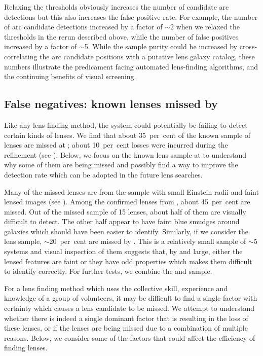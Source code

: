 \documentclass[useAMS,usenatbib,a4paper]{mn2e}
\begin{document}
Relaxing the \af thresholds obviously increases the number of candidate arc
detections but this also increases the false positive rate.
For example, the number of arc candidate detections increased by a factor
of $\sim$2 when we relaxed the thresholds in the rerun described above,
while the number of false positives increased by a factor of $\sim$5.
While the \af sample purity could be increased by
cross-correlating the arc candidate positions with a putative lens
galaxy catalog, these numbers illustrate the predicament facing automated
lens-finding algorithms, and the continuing benefits of visual screening.


\subsection{False negatives: known lenses missed by \sw}
\label{sec:fn}

Like any lens finding method, the \sw system could potentially be
failing to detect certain kinds of lenses.  We find that about
35~per~cent of the known sample of lenses are missed at \StageOne; 
about 10~per~cent losses were incurred during the \StageTwo refinement
(see ).  Below, we focus on the known lens sample at
\StageOne to understand why some of them are being missed and possibly
find a way to improve the detection rate which can be adopted in the
future \sw lens searches.

Many of the missed lenses are from the \rf sample with small
Einstein radii and faint lensed images (see ). Among
the confirmed lenses from \rf, about 45~per~cent are missed. Out of the
missed sample of 15 lenses, about half of them are visually difficult to
detect. The other half appear to have faint blue smudges around
galaxies which should have been easier to identify. Similarly,
if we consider the \af lens sample, $\sim$20~per~cent are missed by \sw. This
is a relatively small sample of $\sim 5$ systems and visual inspection
of them suggests that, by and large, either the lensed features are faint
or they have odd properties which makes them difficult to identify
correctly. For further tests, we combine the \rf and \af sample.

For a lens finding method which uses the collective skill, experience and
knowledge of a group of volunteers, it may be difficult to find a single
factor with certainty which causes a lens candidate to be missed. We
attempt to understand whether there is indeed a single dominant factor
that is resulting in the loss of these lenses, or if the lenses are being
missed due to a combination of multiple reasons. Below, we consider some
of the factors that could affect the efficiency of finding lenses.
\end{document}
